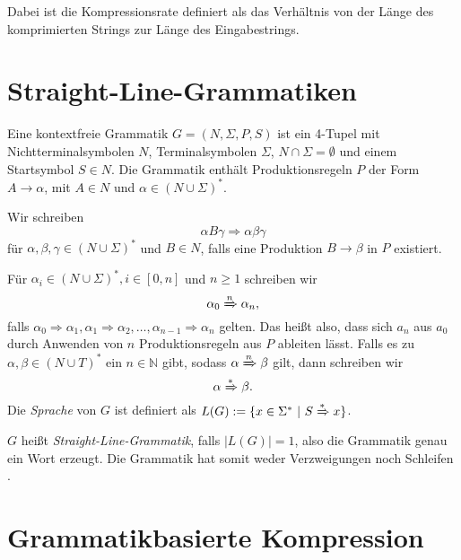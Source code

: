 Dabei ist die Kompressionsrate definiert als das Verhältnis von der Länge des komprimierten Strings zur Länge des Eingabestrings.

\section{Straight-Line-Grammatiken}

Eine kontextfreie Grammatik $G = (N, \Sigma, P, S)$ ist ein 4-Tupel mit Nichtterminalsymbolen $N$, Terminalsymbolen $\Sigma$, $N \cap \Sigma = \emptyset$ und einem Startsymbol $S \in N$.
Die Grammatik enthält Produktionsregeln $P$ der Form $A \rightarrow \alpha$, mit $A \in N$ und $\alpha \in (N \cup \Sigma)^*$.

Wir schreiben 
\begin{equation*}
	\alpha B \gamma \Rightarrow \alpha \beta \gamma
\end{equation*}
für $\alpha, \beta, \gamma \in (N \cup \Sigma)^*$ und $B \in N$, falls eine Produktion $B \rightarrow \beta$ in $P$ existiert. 

Für $\alpha_i \in (N \cup \Sigma)^*, i \in [0,n]$ und $n \geq 1$ schreiben wir 
\begin{equation*}
	\alpha_0 \xRightarrow{n} \alpha_n,
\end{equation*}
falls $\alpha_0 \Rightarrow \alpha_1, \alpha_1 \Rightarrow \alpha_2, \dots, \alpha_{n-1} \Rightarrow \alpha_n$ gelten. Das heißt also, dass sich $a_n$ aus $a_0$ durch Anwenden von $n$ Produktionsregeln aus $P$ ableiten lässt.
Falls es zu $\alpha, \beta \in (N \cup T)^*$ ein $n \in \mathbb{N}$ gibt, sodass $\alpha \xRightarrow{n} \beta$ gilt, dann schreiben wir 
\begin{equation*}
	\alpha \xRightarrow{*} \beta.
\end{equation*}
Die \emph{Sprache} von $G$ ist definiert als $L(G) := \{x \in \Sigma^*\ |\ S \xRightarrow{*} x\}$.

$G$ heißt \emph{Straight-Line-Grammatik}, falls $|L(G)| = 1$, also die Grammatik genau ein Wort erzeugt. Die Grammatik hat somit weder Verzweigungen noch Schleifen \cite{benz_effective_2013}. 

\section{Grammatikbasierte Kompression}

